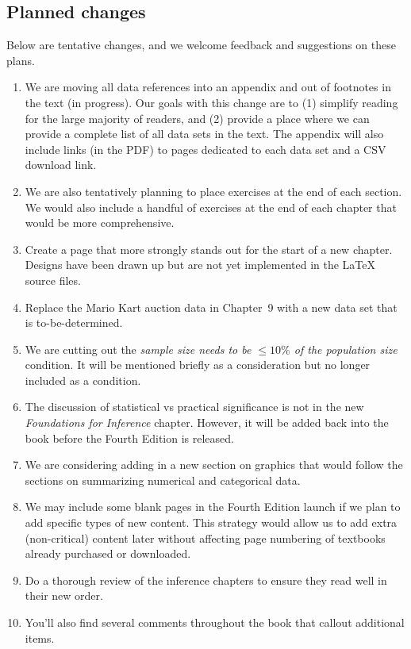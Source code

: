 \subsection*{Planned changes}

\noindent%
Below are tentative changes, and we welcome
feedback and suggestions on these plans.
\begin{enumerate}
\item%
    We are moving all data references into an appendix
    and out of footnotes in the text (in progress).
    Our goals with this change are to
    (1) simplify reading for the large majority of readers,
    and (2) provide a place where we can provide a complete
    list of all data sets in the text.
    The appendix will also include links (in the PDF)
    to pages dedicated to each data set
    and a CSV download link.
\item
    We are also tentatively planning to place exercises
    at the end of each section.
    We would also include a handful of exercises at the
    end of each chapter that would be more comprehensive.
\item
    Create a page that more strongly stands out for the
    start of a new chapter.
    Designs have been drawn up but are not yet implemented
    in the \LaTeX{} source files.
\item
    Replace the Mario Kart auction data in
    Chapter~9 with a new data set that is to-be-determined.
\item
    We are cutting out the
    \emph{sample size needs to be $\leq 10\%$ of the
    population size} condition.
    It will be mentioned briefly as a consideration
    but no longer included as a condition.
\item
    The discussion of statistical vs practical significance
    is not in the new \emph{Foundations for Inference} chapter.
    However, it will be added back into the book before the
    Fourth Edition is released.
\item
    We are considering adding in a new section on graphics
    that would follow the sections on summarizing numerical
    and categorical data.
\item
    We may include some blank pages in the Fourth Edition
    launch if we plan to add specific types of new content.
    This strategy would allow us to add extra (non-critical)
    content later without affecting page numbering of
    textbooks already purchased or downloaded.
\item
    Do a thorough review of the inference chapters
    to ensure they read well in their new order.
\item
    You'll also find several comments throughout the book
    that callout additional items.
\end{enumerate}







